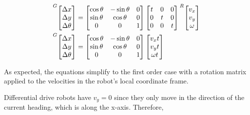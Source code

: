 \begin{align*}
  \prescript{G}{}{\begin{bmatrix}
    \Delta x \\
    \Delta y \\
    \Delta \theta
  \end{bmatrix}} &=
  \begin{bmatrix}
    \cos\theta & -\sin\theta & 0 \\
    \sin\theta &  \cos\theta & 0 \\
             0 &           0 & 1
  \end{bmatrix}
  \begin{bmatrix}
    t & 0 & 0 \\
    0 & t & 0 \\
    0 & 0 & t
  \end{bmatrix}
  \prescript{R}{}{\begin{bmatrix}
    v_x \\
    v_y \\
    \omega
  \end{bmatrix}} \\
  \prescript{G}{}{\begin{bmatrix}
    \Delta x \\
    \Delta y \\
    \Delta \theta
  \end{bmatrix}} &=
  \begin{bmatrix}
    \cos\theta & -\sin\theta & 0 \\
    \sin\theta &  \cos\theta & 0 \\
             0 &           0 & 1
  \end{bmatrix}
  \begin{bmatrix}
    v_x t \\
    v_y t \\
    \omega t
  \end{bmatrix}
\end{align*}

As expected, the equations simplify to the first order case with a rotation
matrix applied to the velocities in the robot's local coordinate frame.

Differential drive robots have $v_y = 0$ since they only move in the direction
of the current heading, which is along the x-axis. Therefore,

